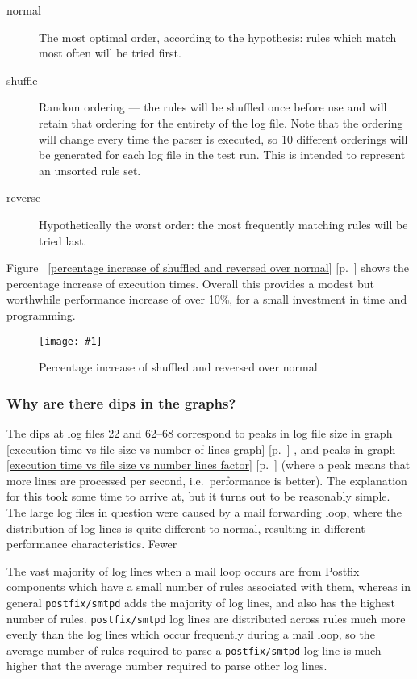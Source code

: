 \documentclass[draft]{svmult}
\newcommand{\showgraph}[3]{
    \begin{figure}[hbt!]
        \caption{#2}\label{#3}
        \texttt{[image: \#1]}
    \end{figure}
}
\newcommand{\refwithpage}[1]{%
    \empty{}\ref{#1} [p.~\pageref{#1}]%
}
\newcommand{\daemon}[1]{%
    \texttt{postfix/#1}%
}
\begin{document}
\begin{description}

    \item [normal]  The most optimal order, according to the hypothesis:
        rules which match most often will be tried first.

    \item [shuffle] Random ordering --- the rules will be shuffled once
        before use and will retain that ordering for the entirety of the
        log file.  Note that the ordering will change every time the parser
        is executed, so 10 different orderings will be generated for each
        log file in the test run.  This is intended to represent an
        unsorted rule set.

    \item [reverse] Hypothetically the worst order: the most frequently
        matching rules will be tried last.

\end{description}

Figure~\refwithpage{percentage increase of shuffled and reversed over
normal} shows the percentage increase of execution times.  Overall this
provides a modest but worthwhile performance increase of over 10\%, for a
small investment in time and programming.
\showgraph{build/plot-normal-shuffle-reverse-factor}{Percentage increase of
shuffled and reversed over normal}{percentage increase of shuffled and
reversed over normal}

\subsubsection{Why are there dips in the graphs?}
\label{Why are there dips in the graphs?}

The dips at log files 22 and 62--68 correspond to peaks in log file size in
graph~\refwithpage{execution time vs file size vs number of lines graph},
and peaks in graph~\refwithpage{execution time vs file size vs number lines
factor} (where a peak means that more lines are processed per second, i.e.\
performance is better).  The explanation for this took some time to arrive
at, but it turns out to be reasonably simple.  The large log files in
question were caused by a mail forwarding loop, where the distribution of
log lines is quite different to normal, resulting in different performance
characteristics.  Fewer 

The vast majority of log lines when a mail loop occurs are from Postfix
components which have a small number of rules associated with them, whereas
in general \daemon{smtpd} adds the majority of log lines, and also has the
highest number of rules.  \daemon{smtpd} log lines are distributed across
rules much more evenly than the log lines which occur frequently during a
mail loop, so the average number of rules
required to parse a \daemon{smtpd} log line is much higher that the average
number required to parse other log lines.
\end{document}
